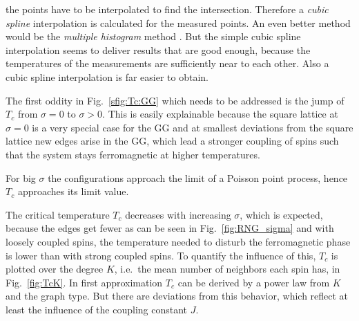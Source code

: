 the points have to be interpolated to find the intersection. Therefore
a \emph{cubic spline} interpolation %
is calculated for the measured points.
An even better method would be the
\emph{multiple histogram} method \cite[p. 219ff]{NewmanBarkema1999}.
But the simple cubic spline interpolation seems to deliver results that
are good enough, because the temperatures of the measurements are
sufficiently near to each other. Also a cubic spline interpolation is
far easier to obtain.

The first oddity in Fig.~\ref{sfig:Tc:GG} which needs to be addressed is
the jump of $T_c$ from $\sigma = 0$ to $\sigma > 0$. This is easily explainable
because the square lattice at $\sigma = 0$ is a very special case for the
GG and at smallest deviations from the square lattice new edges arise in
the GG, which lead a stronger coupling of spins such that the system stays
ferromagnetic at higher temperatures.

For big $\sigma$ the configurations approach the limit of a Poisson point
process, hence $T_c$ approaches its limit value.

The critical temperature $T_c$ decreases with increasing $\sigma$, which
is expected, because the edges get fewer as can be seen in
Fig.~\ref{fig:RNG_sigma} and with loosely coupled spins, the temperature
needed to disturb the ferromagnetic phase is lower than with strong coupled
spins. To quantify the influence of this, $T_c$ is plotted over the
degree $K$, i.e.~the mean number of neighbors each spin has, in Fig.~\ref{fig:TcK}.
In first approximation $T_c$ can be derived by a power law from $K$ and the
graph type. But there are deviations from this behavior, which reflect
at least the influence of the coupling constant $J$.
